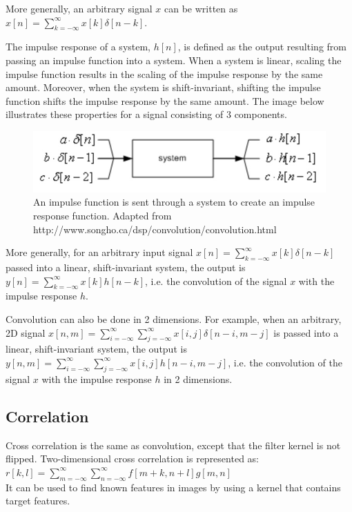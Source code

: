 \documentclass{article}
\begin{document}
More generally, an arbitrary signal $x$ can be written as $x[n] = \sum_{k = -\infty}^{\infty} x[k]\delta[n-k]$.

The impulse response of a system, $h[n]$, is defined as the output resulting from passing an impulse function into a system. When a system is linear, scaling the impulse function results in the scaling of the impulse response by the same amount. Moreover, when the system is shift-invariant, shifting the impulse function shifts the impulse response by the same amount. The image below illustrates these properties for a signal consisting of 3 components.


\begin{figure}[h!]
\begin{center}
\includegraphics[scale=0.4]{impulse_response.jpeg}
\caption{An impulse function is sent through a system to create an impulse response function. Adapted from http://www.songho.ca/dsp/convolution/convolution.html}
\end{center}
\end{figure}


More generally, for an arbitrary input signal $x[n] = \sum_{k = -\infty}^{\infty} x[k]\delta[n-k]$ passed into a linear, shift-invariant system, the output is $y[n] = \sum_{k = -\infty}^{\infty} x[k]h[n-k]$, i.e. the convolution of the signal $x$ with the impulse response $h$.

Convolution can also be done in 2 dimensions. For example, when an arbitrary, 2D signal $x[n, m] = \sum_{i = -\infty}^{\infty}\sum_{j = -\infty}^{\infty} x[i, j]\delta[n-i, m-j]$ is passed into a linear, shift-invariant system, the output is $y[n,m] = \sum_{i = -\infty}^{\infty}\sum_{j = -\infty}^{\infty} x[i, j]h[n-i, m-j]$, i.e. the convolution of the signal $x$ with the impulse response $h$ in 2 dimensions.


\subsection{Correlation}

Cross correlation is the same as convolution, except that the filter kernel is not flipped. Two-dimensional cross correlation is represented as: \\
$r[k,l] = \sum_{m=-\infty} ^\infty \sum_{n=-\infty} ^\infty f[m+k, n+l]g[m, n]$\\
It can be used to find known features in images by using a kernel that contains target features.
\end{document}
